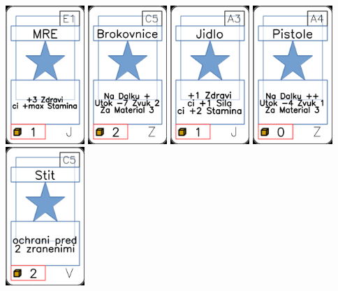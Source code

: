 \documentclass[a4paper]{article}
\begin{document}
	\includegraphics[width=3.0cm]{img-1_20}
	\includegraphics[width=3.0cm]{img-1_104}
	\includegraphics[width=3.0cm]{img-1_2}
	\includegraphics[width=3.0cm]{img-1_93}
	\includegraphics[width=3.0cm]{img-1_74}
\end{document}
